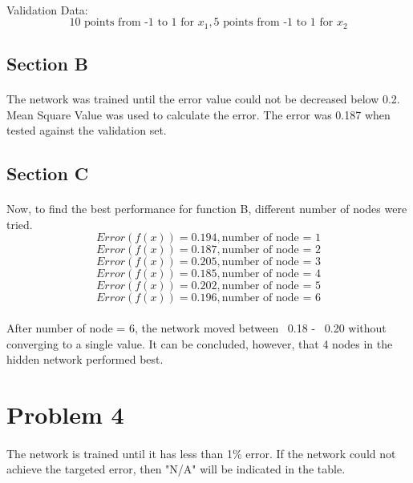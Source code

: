 \documentclass[12pt, letterpaper]{report}
\begin{document}
\paragraph*{} Validation Data:
\[\text{10 points from -1 to 1 for }x_1, \text{5 points from -1 to 1 for }x_2\]
\subsection*{Section B}
\paragraph*{} The network was trained until the error value could not be decreased below 0.2. Mean Square Value was used to calculate the error. The error was 0.187 when tested against the validation set.
\subsection*{Section C}
\paragraph*{} Now, to find the best performance for function B, different number of nodes were tried.
\[ Error(f(x)) = 0.194, \text{number of node = 1} \]
\[ Error(f(x)) = 0.187, \text{number of node = 2} \]
\[ Error(f(x)) = 0.205, \text{number of node = 3} \]
\[ Error(f(x)) = 0.185, \text{number of node = 4} \]
\[ Error(f(x)) = 0.202, \text{number of node = 5} \]
\[ Error(f(x)) = 0.196, \text{number of node = 6} \]
\paragraph*{} After number of node = 6, the network moved between ~0.18 - ~0.20 without converging to a single value. It can be concluded, however, that 4 nodes in the hidden network performed best.
\section*{Problem 4}
\paragraph*{} The network is trained until it has less than 1\% error. If the network could not achieve the targeted error, then "N/A" will be indicated in the table.
\end{document}
